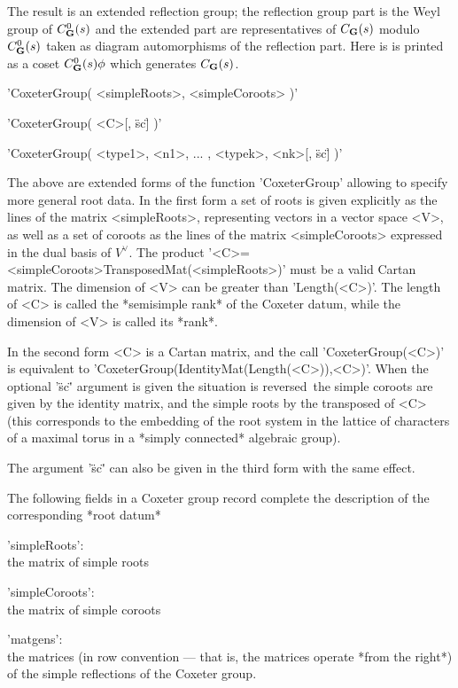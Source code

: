 The  result is an  extended reflection group;  the reflection group part is
the Weyl group of $C_{\mathbf G}^0(s)$ and the extended part are representatives of
$C_{\mathbf G}(s)$  modulo  $C_{\mathbf G}^0(s)$  taken  as  diagram  automorphisms  of the
reflection  part.  Here  is  is  printed  as a coset $C_{\mathbf G}^0(s)\phi$ which
generates $C_{\mathbf G}(s)$.


'CoxeterGroup( <simpleRoots>, <simpleCoroots> )'

'CoxeterGroup( <C>[, \"sc\"] )'

'CoxeterGroup( <type1>, <n1>, ... , <typek>, <nk>[, \"sc\"] )'

The  above are  extended forms  of the  function 'CoxeterGroup' allowing to
specify  more general root data. In the first  form a set of roots is given
explicitly  as the lines of  the matrix <simpleRoots>, representing vectors
in  a vector space  <V>, as well  as a set  of coroots as  the lines of the
matrix <simpleCoroots> expressed in the dual basis of $V^\vee$. The product
'<C>=<simpleCoroots>\*TransposedMat(<simpleRoots>)'  must be a valid Cartan
matrix.  The dimension of <V> can be greater than 'Length(<C>)'. The length
of  <C> is  called the  *semisimple rank*  of the  Coxeter datum, while the
dimension of <V> is called its *rank*.

In the second form <C> is a Cartan matrix, and the call 'CoxeterGroup(<C>)'
is  equivalent  to  'CoxeterGroup(IdentityMat(Length(<C>)),<C>)'.  When the
optional '\"sc\"' argument is given the situation is reversed\:\ the simple
coroots  are given  by the  identity matrix,  and the  simple roots  by the
transposed  of <C> (this corresponds to the embedding of the root system in
the  lattice  of  characters  of  a  maximal  torus in a *simply connected*
algebraic group).

The argument '\"sc\"' can also be given in the third form with the same
effect.

The  following fields in a Coxeter group record complete the description of
the corresponding *root datum*\:

'simpleRoots':\\ the matrix of simple roots

'simpleCoroots':\\ the matrix of simple coroots

'matgens':\\  the matrices  (in row  convention ---  that is,  the matrices
   operate *from the right*) of the simple reflections of the Coxeter group.

